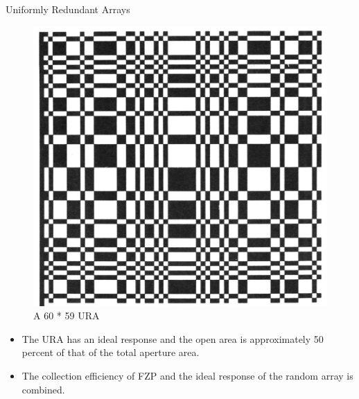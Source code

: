 \documentclass{beamer}
\begin{document}
\begin{frame}{Uniformly Redundant Arrays}
\begin{figure}{
\includegraphics[scale=0.125]{doc_images/lensless_5.PNG}
\caption{A 60 * 59 URA}}
\end{figure}
\begin{itemize}
\item The URA has an ideal response and the open area is approximately 50 percent of that of the total aperture area.
\item The collection efficiency of FZP and the ideal response of the random array is combined.
\end{itemize}
\end{frame}
\end{document}
